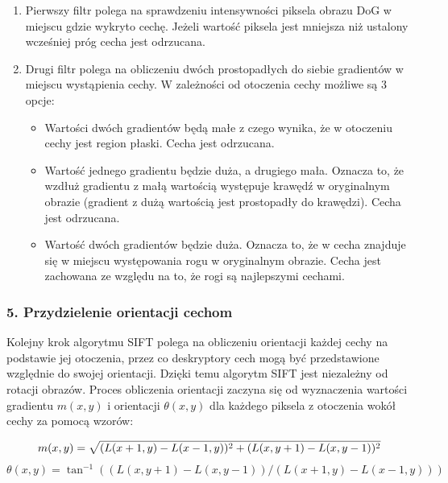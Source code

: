 \begin{enumerate}
\item Pierwszy filtr polega na sprawdzeniu intensywności piksela obrazu DoG w miejscu gdzie wykryto cechę. Jeżeli wartość piksela jest mniejsza niż ustalony wcześniej próg cecha jest odrzucana.
\item Drugi filtr polega na obliczeniu dwóch prostopadłych do siebie gradientów w miejscu wystąpienia cechy. W zależności od otoczenia cechy możliwe są 3 opcje:
  \begin{itemize}
  \item Wartości dwóch gradientów będą małe z czego wynika, że w otoczeniu cechy jest region płaski. Cecha jest odrzucana.
  \item Wartość jednego gradientu będzie duża, a drugiego mała. Oznacza to, że wzdłuż gradientu z małą wartością występuje krawędź w oryginalnym obrazie (gradient z dużą wartością jest prostopadły do krawędzi). Cecha jest odrzucana.
  \item Wartość dwóch gradientów będzie duża. Oznacza to, że w cecha znajduje się w miejscu występowania rogu w oryginalnym obrazie. Cecha jest zachowana ze względu na to, że rogi są najlepszymi cechami.
  \end{itemize}
\end{enumerate}

\subsubsection{5. Przydzielenie orientacji cechom}
\label{sec:proponowane_algorytmy:orientacja}

Kolejny krok algorytmu SIFT polega na obliczeniu orientacji każdej cechy na podstawie jej otoczenia, przez co deskryptory cech mogą być przedstawione względnie do swojej orientacji. Dzięki temu algorytm SIFT jest niezależny od rotacji obrazów. Proces obliczenia orientacji zaczyna się od wyznaczenia wartości gradientu $m(x, y)$ i orientacji $\theta(x, y)$ dla każdego piksela z otoczenia wokół cechy za pomocą wzorów:

\begin{equation}
m(x, y) = \sqrt{(L(x + 1, y) - L(x - 1, y))^2 + (L(x, y + 1) - L(x, y - 1))^2} \\
\label{eq:magnitude}
\end{equation}
\begin{equation}
\theta(x, y) = \tan^{-1}((L(x, y + 1) - L(x, y - 1))/(L(x + 1, y) - L(x - 1, y)))
\label{eq:orientation}
\end{equation}

